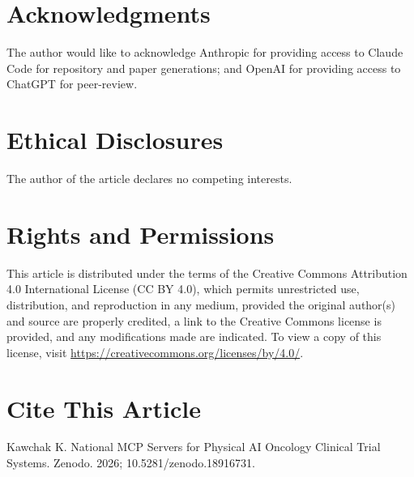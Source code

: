 \documentclass{article}
\begin{document}
\clearpage

\section*{Acknowledgments}

The author would like to acknowledge Anthropic for providing access to Claude Code for repository and paper generations; and OpenAI for providing access to ChatGPT for peer-review.

\section*{Ethical Disclosures}

The author of the article declares no competing interests.

\section*{Rights and Permissions}

This article is distributed under the terms of the Creative Commons Attribution 4.0 International License (CC BY 4.0), which permits unrestricted use, distribution, and reproduction in any medium, provided the original author(s) and source are properly credited, a link to the Creative Commons license is provided, and any modifications made are indicated. To view a copy of this license, visit \url{https://creativecommons.org/licenses/by/4.0/}.

\section*{Cite This Article}

Kawchak K. National MCP Servers for Physical AI Oncology Clinical Trial Systems. Zenodo. 2026; 10.5281/zenodo.18916731.
\end{document}
